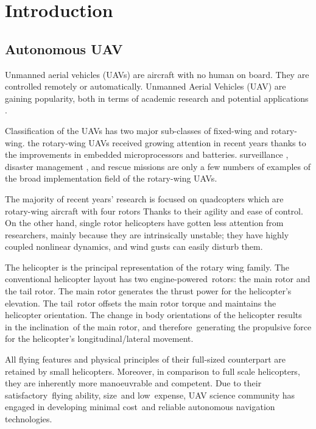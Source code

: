 \chapter{Introduction}

\section{Autonomous UAV}

Unmanned aerial vehicles (UAVs) are aircraft with no human on board. They are controlled remotely or automatically. Unmanned Aerial Vehicles (UAV) are gaining popularity, both in terms of academic research and potential applications \cite{valavanis2015handbook}. 

Classification of the UAVs has two major sub-classes of fixed-wing and rotary-wing. the rotary-wing UAVs received growing attention in recent years thanks to the improvements in embedded microprocessors and batteries.  surveillance \cite{semsch2009autonomous,puri2005survey}, disaster management \cite{maza2011experimental, birk2011safety}, and
rescue missions \cite{alotaibi2019lsar} are only a few numbers of examples of the broad implementation field of the rotary-wing UAVs.  

The majority of recent years' research is focused on quadcopters which are rotary-wing aircraft with four rotors \cite{luukkonen2011modelling, gheorghictua2015quadcopter, wang2016dynamics, bashi2017unmanned} Thanks to their agility and ease of control. On the other hand, single rotor helicopters have gotten less attention from researchers, mainly because they are intrinsically unstable; they have highly coupled nonlinear dynamics, and wind gusts can easily disturb them.  

The helicopter is the principal representation of the rotary wing family. The conventional helicopter layout has two engine-powered rotors: the main rotor and the tail rotor. The main rotor generates the thrust power for the helicopter's elevation. The tail rotor offsets the main rotor torque and maintains the helicopter orientation. The change in body orientations of the helicopter results in the inclination of the main rotor, and therefore generating the propulsive force for the helicopter's longitudinal/lateral movement. 


All flying features and physical principles of their full-sized counterpart are retained by small helicopters. Moreover, in comparison to full scale helicopters, they are inherently more manoeuvrable and competent. Due to their satisfactory flying ability, size and low expense, UAV science community has engaged in developing minimal cost and reliable autonomous navigation technologies. 

